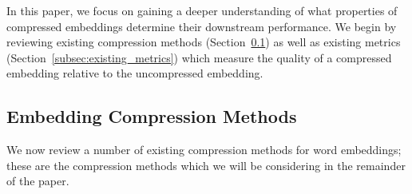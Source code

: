 In this paper, we focus on gaining a deeper understanding of what properties of compressed embeddings determine their downstream performance.
We begin by reviewing existing compression methods (Section~\ref{subsec:existing_methods}) as well as existing metrics (Section~\ref{subsec:existing_metrics}) which measure the quality of a compressed embedding relative to the uncompressed embedding.


\subsection{Embedding Compression Methods}
\label{subsec:existing_methods}
We now review a number of existing compression methods for word embeddings;
these are the compression methods which we will be considering in the remainder of the paper.

